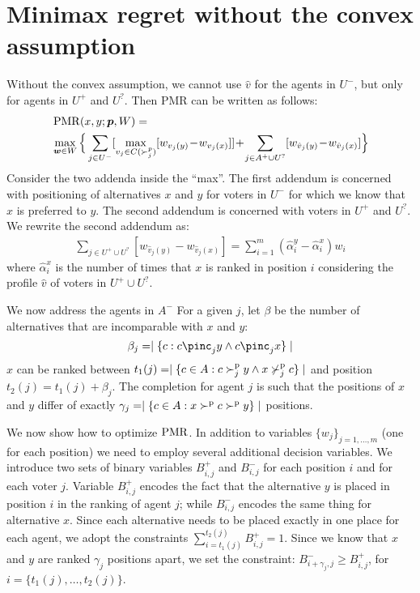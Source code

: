 \section{Minimax regret without the convex assumption}
Without the convex assumption, we cannot use $\hat{v}$ for the agents in $U^{-}$, but only for agents in $U^{+}$ and $U^{?}$.
Then PMR can be written as follows:
\begin{align*}
 &\operatorname{PMR}(x,y; {\bm{p}}, W) =\\ 
 &\max_{\bm{w} \in W} \Big \{ \sum_{j \in U^-} [\max_{v_j \in C(\succ_j^p)} [w_{v_j(y)} \!-\! w_{v_j(x)}]] 
  \!+\!	 \sum_{j \in A^+ \cup  U^?} [w_{\hat{v}_j(y)} \!-\! w_{\hat{v}_j(x)}] \Big \} 
 \end{align*}
Consider the two addenda inside the ``max''. 
The first addendum is concerned with positioning of alternatives $x$ and $y$ for voters in $U^{-}$ for which we know that $x$ is preferred to $y$.
The second addendum is concerned with voters in $U^{+}$ and $U^{?}$.
We rewrite the second addendum as:
\begin{align*}
\sum_{j \in U^+ \cup  U^?} [w_{\hat{v}_j(y)} \!-\! w_{\hat{v}_j(x)}] 
= \sum_{i = 1}^{m} (\hat{\alpha}_{i}^{y} - \hat{\alpha}_{i}^{x}) w_{i}
\end{align*}
where $\hat{\alpha}_{i}^{x}$ is the number of times that $x$ is ranked  in position $i$  considering the profile $\hat{v}$ of voters in $U^+ \cup  U^?$.

We now address the agents in $A^{-}$
For a given $j$, let $\beta$ be the number of alternatives that are incomparable with $x$ and $y$:
\[ \beta_{j} = \mid \{ c : c \pinc_{j} y \wedge c \pinc_{j} x \} \mid \]
$x$ can be ranked between $t_{1}(j)=\mid \{ c \in A : c \succ^\text{p}_{j} y \wedge x \nsucc^\text{p}_{j} c \} \mid $ and position $t_{2}(j)=t_{1}(j)+\beta_{j}$.
The completion for agent $j$ is such that the positions of $x$ and $y$ differ of exactly $\gamma_{j} =
\mid \{ c \in A : x \succ^\text{p} c \succ^\text{p} y \} \mid$ positions.


We now show how to optimize $\operatorname{PMR}$.
In addition to variables $\{ w_{j} \}_{j=1,\ldots,m}$ (one for each position) we need to employ several additional decision variables.
We introduce two sets of binary variables $B^{+}_{i,j}$ and $B^{-}_{i,j}$  for each position $i$ and for each voter $j$.
Variable $B_{i,j}^{+}$ encodes the fact that the alternative $y$ is placed in position $i$ in the ranking of agent $j$; while  $B_{i,j}^{-}$ encodes the same thing for alternative $x$.
Since each alternative needs to be placed exactly in one place for each agent, we adopt the constraints
$\sum_{i=t_{1}(j)}^{t_{2}(j)} B_{i,j}^{+} = 1$.
Since we know that $x$ and $y$ are ranked $\gamma_{j}$ positions apart, we set the constraint:
$B_{i+\gamma_{j},j}^{-} \geq B_{i,j}^{+}$,  for $i = \{ t_{1}(j), \ldots, t_{2}(j)\}$.

